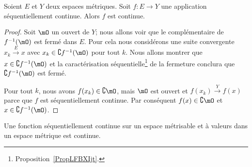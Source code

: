 \begin{proposition} \label{PropXIAQSXr}
    Soient \( E\) et \( Y\) deux espaces métriques. Soit \( f\colon E\to Y\) une application séquentiellement continue. Alors \( f\) est continue.
\end{proposition}

\begin{proof}
    Soit \( \mO\) un ouvert de \( Y\); nous allons voir que le complémentaire de \( f^{-1}(\mO)\) est fermé dans \( E\). Pour cela nous considérons une suite convergente \( x_k\stackrel{E}{\longrightarrow} x\) avec \( x_k\in\complement f^{-1}(\mO)\) pour tout \( k\). Nous allons montrer que \( x\in \complement f^{-1}(\mO)\) et la caractérisation séquentielle\footnote{Proposition~\ref{PropLFBXIjt}.} de la fermeture conclura que \( \complement f^{-1}(\mO)\) est fermé.

    Pour tout \( k\), nous avons \( f(x_k)\in\complement \mO\), mais \( \mO\) est ouvert et \( f(x_k)\stackrel{Y}{\longrightarrow}f(x)\) parce que \( f\) est séquentiellement continue. Par conséquent \( f(x)\in\complement \mO\) et \( x\in\complement f^{-1}(\mO)\).
\end{proof}


\begin{proposition} \label{PROPooKNVUooMbLZoy}
    Une fonction séquentiellement continue sur un espace métrisable et à valeurs dans un espace métrique est continue.
\end{proposition}

